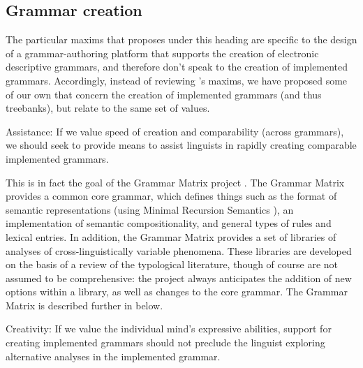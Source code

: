 \subsection{Grammar creation}

The particular maxims that \citeauthor{Nordhoff:08} proposes under
this heading are specific to the design of a grammar-authoring platform
that supports the creation of electronic descriptive grammars, and
therefore don't speak to the creation of implemented grammars. Accordingly,
instead of reviewing \citeauthor{Nordhoff:08}'s maxims, we have
proposed some of our own that concern the creation of implemented
grammars (and thus treebanks), but relate to the same set of values.

\begin{exe}
\ex\label{ex:cc} {\sc Assistance}: If we value speed of creation
and comparability (across grammars), we should seek to provide
means to assist linguists in rapidly creating comparable implemented grammars.
\end{exe}

This is in fact the goal of the Grammar Matrix project
\citep{Ben:Fli:Oep:02,Ben:Dre:Fok:Pou:Sal:10}.  
The Grammar Matrix provides a common core grammar, which defines
things such as the format of semantic representations (using Minimal
Recursion Semantics \citep{Cop:Fli:Pol:Sag:05}), an implementation of
semantic compositionality, and general types of rules and lexical
entries.  In addition, the Grammar Matrix provides a set of libraries
of analyses of cross-linguistically variable phenomena.  These libraries
are developed on the basis of a review of the typological literature,
though of course are not assumed to be comprehensive: the project
always anticipates the addition of new options within a library, as well 
as changes to the core grammar.
The Grammar Matrix is described further in  below.

\begin{exe}
\ex\label{ex:cr} {\sc Creativity}: If we value the individual mind's expressive
abilities, support for creating implemented grammars should
not preclude the linguist exploring alternative analyses in the
implemented grammar.
\end{exe}

